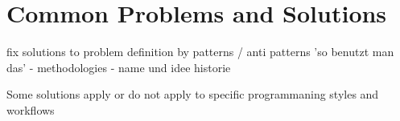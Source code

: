 

\chapter{Common Problems and Solutions}
fix solutions to problem
definition by patterns / anti patterns
'so benutzt man das'
- methodologies
- 
name und idee
historie









Some solutions apply or do not apply to specific programmaning styles and workflows
